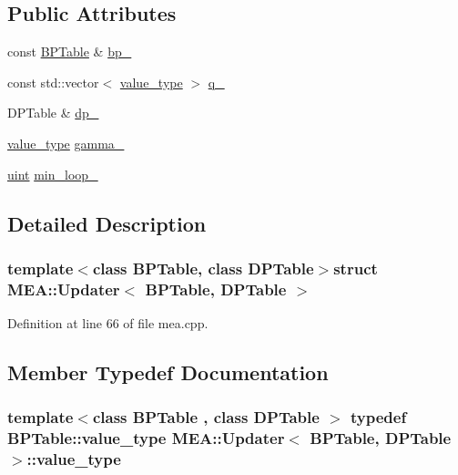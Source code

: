 \subsection*{Public Attributes}
\begin{DoxyCompactItemize}
\item 
const \hyperlink{folding__engine_8h_a065821fb17bbd8df315f2435c973e3c1}{B\+P\+Table} \& \hyperlink{struct_m_e_a_1_1_updater_a49f2733a73cd8c11eff32a876d026e01}{bp\+\_\+}
\item 
const std\+::vector$<$ \hyperlink{struct_m_e_a_1_1_updater_a34ff27ad742334ae0d3f317810362f2a}{value\+\_\+type} $>$ \hyperlink{struct_m_e_a_1_1_updater_a06a1f82c408b0c63fb2e56f1fffa4cea}{q\+\_\+}
\item 
D\+P\+Table \& \hyperlink{struct_m_e_a_1_1_updater_ab78089f3d41c25887c7586de0b1e1910}{dp\+\_\+}
\item 
\hyperlink{struct_m_e_a_1_1_updater_a34ff27ad742334ae0d3f317810362f2a}{value\+\_\+type} \hyperlink{struct_m_e_a_1_1_updater_a098bbe27695679391e12aaf0ec72d274}{gamma\+\_\+}
\item 
\hyperlink{cyktable_8h_a91ad9478d81a7aaf2593e8d9c3d06a14}{uint} \hyperlink{struct_m_e_a_1_1_updater_a8831f08c5d04f9fd05d1d9dd284af641}{min\+\_\+loop\+\_\+}
\end{DoxyCompactItemize}


\subsection{Detailed Description}
\subsubsection*{template$<$class B\+P\+Table, class D\+P\+Table$>$struct M\+E\+A\+::\+Updater$<$ B\+P\+Table, D\+P\+Table $>$}



Definition at line 66 of file mea.\+cpp.



\subsection{Member Typedef Documentation}
\hypertarget{struct_m_e_a_1_1_updater_a34ff27ad742334ae0d3f317810362f2a}{
\subsubsection[{value\+\_\+type}]{\setlength{\rightskip}{0pt plus 5cm}template$<$class B\+P\+Table , class D\+P\+Table $>$ typedef {\bf B\+P\+Table\+::value\+\_\+type} {\bf M\+E\+A\+::\+Updater}$<$ {\bf B\+P\+Table}, D\+P\+Table $>$\+::{\bf value\+\_\+type}}}\label{struct_m_e_a_1_1_updater_a34ff27ad742334ae0d3f317810362f2a}


